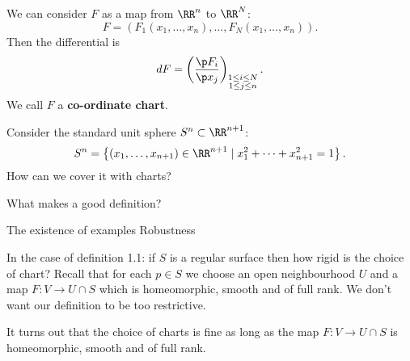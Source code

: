 \begin{rmk}
  We can consider $F$ as a map from $\RR^n$ to $\RR^N$:
  \[ F = \left( F_1(x_1,\ldots,x_n),\ldots,F_N(x_1,\ldots,x_n) \right). \]
  Then the differential is
  \[ dF = \left( \frac{\p F_i}{\p x_j} \right)_{\substack{1 \leq i \leq N \\ 1 \leq j \leq n}}. \]
  We call $F$ a \textbf{co-ordinate chart}.
\end{rmk}

\begin{exam}[1.3]
  Consider the standard unit sphere $S^n \subset \RR^{n+1}$:
  \[ S^n = \left\{ (x_1,\ldots,x_{n+1}) \in \RR^{n+1} \mid x_1^2 + \cdots + x_{n+1}^2 = 1 \right\}. \]
  How can we cover it with charts?
\end{exam}

\begin{rmk}
  What makes a good definition?
  \begin{enum}
    \io The existence of examples
    \io Robustness
  \end{enum}
  In the case of definition 1.1: if $S$ is a regular surface then how rigid is the choice of chart?
  Recall that for each $p \in S$ we choose an open neighbourhood $U$ and a map $F: V \to U \cap S$ which is homeomorphic, smooth and of full rank.
  We don't want our definition to be too restrictive.

  It turns out that the choice of charts is fine as long as the map $F: V \to U \cap S$ is homeomorphic, smooth and of full rank.
\end{rmk}

